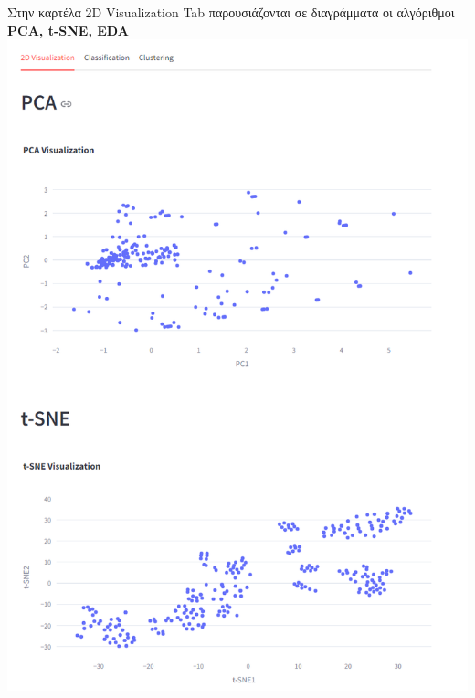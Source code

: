 \documentclass{article}
\begin{document}
Στην καρτέλα 2D Visualization Tab παρουσιάζονται σε διαγράμματα οι αλγόριθμοι \textbf{PCA, t-SNE, EDA}
\includegraphics[width=1.0\linewidth]{tab0_pca_tsne1.png}
\end{document}
